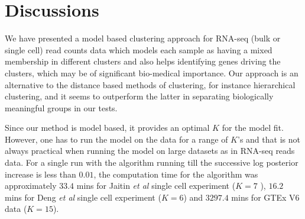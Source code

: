 \section{Discussions}

We have presented a model based clustering approach for RNA-seq (bulk or single cell) read counts data which models each sample as having a mixed membership in different clusters and also helps identifying genes driving the clusters, which may be of significant bio-medical importance. Our approach is an alternative to the distance based methods of clustering, for instance hierarchical clustering, and it seems to outperform the latter in separating biologically meaningful groups in our tests.  



Since our method is model based, it provides an optimal $K$ for the model fit. However, one has to run the model on the data for a range of $K$'s and that is not always practical when running the model on large datasets as in RNA-seq reads data. For a single run with the algorithm running till the successive log posterior increase is less than $0.01$, the computation time for the algorithm was approximately $33.4$ mins for Jaitin \textit{et al} \cite{Jaitin 2014} single cell experiment ($K=7$ ), $16.2$ mins for Deng \textit{et al} single cell experiment ($K=6$) and $3297.4$ mins for GTEx V6 data ($K=15$). 

